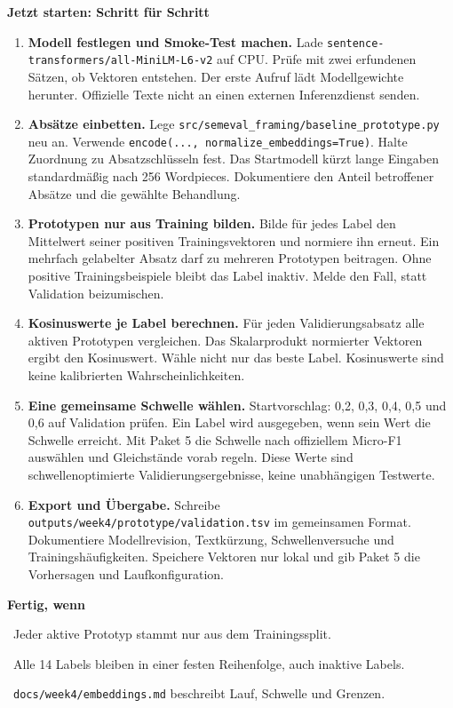 \documentclass[10pt,a4paper]{article}
\newcommand{\checkbox}{\fbox{\rule{0pt}{2.4mm}\hspace{2.4mm}}}
\newcommand{\planheading}[1]{\par\vspace{9pt}\textbf{#1}\par\vspace{3pt}}
\newenvironment{startsteps}{\begin{enumerate}[leftmargin=12mm,label=\checkbox\hspace{2mm}\textbf{\arabic*.},labelsep=2mm,itemsep=7pt,parsep=2pt,topsep=4pt]}{\end{enumerate}}
\begin{document}
\planheading{Jetzt starten: Schritt für Schritt}
\begin{startsteps}
  \item \textbf{Modell festlegen und Smoke-Test machen.}
    Lade \texttt{sentence-transformers/all-MiniLM-L6-v2} auf CPU.
    Prüfe mit zwei erfundenen Sätzen, ob Vektoren entstehen. Der erste Aufruf lädt Modellgewichte herunter.
    Offizielle Texte nicht an einen externen Inferenzdienst senden.
  \item \textbf{Absätze einbetten.}
    Lege \texttt{src/semeval\_framing/baseline\_prototype.py} neu an.
    Verwende \texttt{encode(..., normalize\_embeddings=True)}.
    Halte Zuordnung zu Absatzschlüsseln fest. Das Startmodell kürzt lange Eingaben standardmäßig
    nach 256 Wordpieces. Dokumentiere den Anteil betroffener Absätze und die gewählte Behandlung.
  \item \textbf{Prototypen nur aus Training bilden.}
    Bilde für jedes Label den Mittelwert seiner positiven Trainingsvektoren und normiere ihn erneut.
    Ein mehrfach gelabelter Absatz darf zu mehreren Prototypen beitragen.
    Ohne positive Trainingsbeispiele bleibt das Label inaktiv. Melde den Fall, statt Validation beizumischen.
  \item \textbf{Kosinuswerte je Label berechnen.}
    Für jeden Validierungsabsatz alle aktiven Prototypen vergleichen.
    Das Skalarprodukt normierter Vektoren ergibt den Kosinuswert. Wähle nicht nur das beste Label.
    Kosinuswerte sind keine kalibrierten Wahrscheinlichkeiten.
  \item \textbf{Eine gemeinsame Schwelle wählen.}
    Startvorschlag: 0,2, 0,3, 0,4, 0,5 und 0,6 auf Validation prüfen.
    Ein Label wird ausgegeben, wenn sein Wert die Schwelle erreicht.
    Mit Paket 5 die Schwelle nach offiziellem Micro-F1 auswählen und Gleichstände vorab regeln.
    Diese Werte sind schwellenoptimierte Validierungsergebnisse, keine unabhängigen Testwerte.
  \item \textbf{Export und Übergabe.}
    Schreibe \texttt{outputs/week4/prototype/validation.tsv} im gemeinsamen Format.
    Dokumentiere Modellrevision, Textkürzung, Schwellenversuche und Trainingshäufigkeiten.
    Speichere Vektoren nur lokal und gib Paket 5 die Vorhersagen und Laufkonfiguration.
\end{startsteps}

\planheading{Fertig, wenn}
\checkbox\ Jeder aktive Prototyp stammt nur aus dem Trainingssplit.\par
\checkbox\ Alle 14 Labels bleiben in einer festen Reihenfolge, auch inaktive Labels.\par
\checkbox\ \texttt{docs/week4/embeddings.md} beschreibt Lauf, Schwelle und Grenzen.
\end{document}

